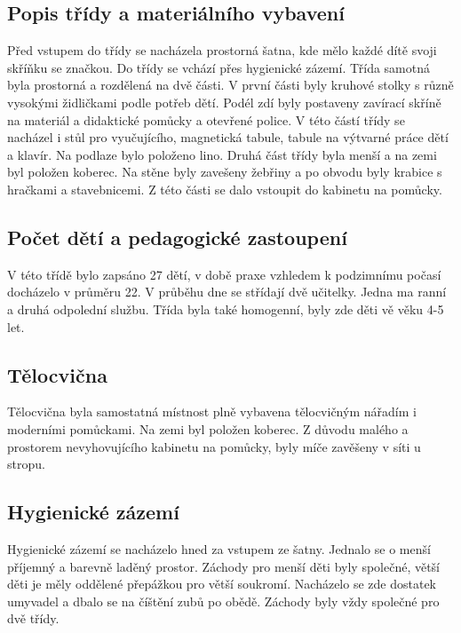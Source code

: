 
		\subsection{Popis třídy a materiálního vybavení}

			Před vstupem do třídy se nacházela prostorná šatna, kde mělo každé dítě svoji skříňku se značkou. Do třídy se vchází přes hygienické zázemí. Třída samotná byla prostorná a rozdělená na dvě části. V první části byly kruhové stolky s různě vysokými židličkami podle potřeb dětí. Podél zdí byly postaveny zavírací skříně na materiál a didaktické pomůcky a otevřené police. V této částí třídy se nacházel i stůl pro vyučujícího, magnetická tabule, tabule na výtvarné práce dětí a klavír. Na podlaze bylo položeno lino. Druhá část třídy byla menší a na zemi byl položen koberec. Na stěne byly zavešeny žebřiny a po obvodu byly krabice s hračkami a stavebnicemi. Z této části se dalo vstoupit do kabinetu na pomůcky.

		\subsection{Počet dětí a pedagogické zastoupení}

			V této třídě bylo zapsáno 27 dětí, v době praxe vzhledem k podzimnímu počasí docházelo v průměru 22. V průběhu dne se střídají dvě učitelky. Jedna ma ranní a druhá odpolední službu.
			Třída byla také homogenní, byly zde děti vě věku 4-5 let.
		
		\subsection{Tělocvična}
			Tělocvična byla samostatná místnost plně vybavena tělocvičným nářadím i moderními pomůckami. Na zemi byl položen koberec. Z důvodu malého a prostorem nevyhovujícího kabinetu na pomůcky,  byly míče zavěšeny v síti u stropu.

		\subsection{Hygienické zázemí}
			Hygienické zázemí se nacházelo hned za vstupem ze šatny. Jednalo se o menší příjemný a barevně laděný prostor. Záchody pro menší děti byly společné, větší děti je měly oddělené přepážkou pro větší soukromí. Nacházelo se zde dostatek umyvadel a dbalo se na číštění zubů po obědě. Záchody byly vždy společné pro dvě třídy. 


